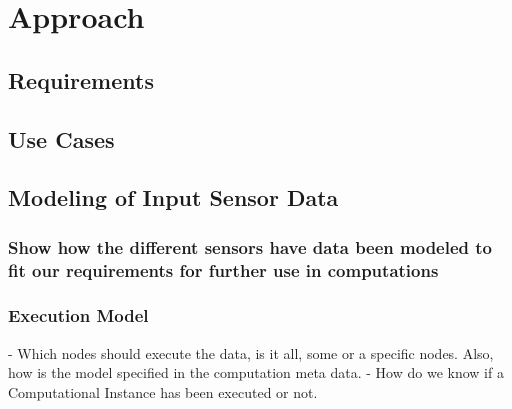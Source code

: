 
\chapter{Approach}\label{chapter:Approach}
\section{Requirements}
\section{Use Cases}


\section{Modeling of Input Sensor Data}
\subsection{Show how the different sensors have data been modeled to fit our requirements for further use in computations}


 \subsection{Execution Model}
- Which nodes should execute the data, is it all, some  or a specific nodes. Also, how is the model specified in the computation meta data.
- How do we know if a Computational Instance has been executed or not.

